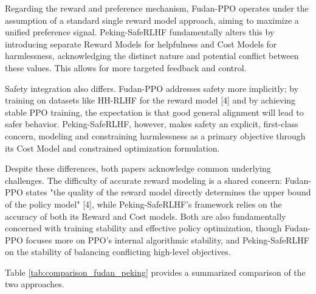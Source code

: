 \documentclass[10pt,journal,compsoc]{IEEEtran} %
\begin{document}
Regarding the reward and preference mechanism, Fudan-PPO operates under the assumption of a standard single reward model approach, aiming to maximize a unified preference signal. Peking-SafeRLHF fundamentally alters this by introducing separate Reward Models for helpfulness and Cost Models for harmlessness, acknowledging the distinct nature and potential conflict between these values. This allows for more targeted feedback and control.

Safety integration also differs. Fudan-PPO addresses safety more implicitly; by training on datasets like HH-RLHF for the reward model [4] and by achieving stable PPO training, the expectation is that good general alignment will lead to safer behavior. Peking-SafeRLHF, however, makes safety an explicit, first-class concern, modeling and constraining harmlessness as a primary objective through its Cost Model and constrained optimization formulation.

Despite these differences, both papers acknowledge common underlying challenges. The difficulty of accurate reward modeling is a shared concern: Fudan-PPO states "the quality of the reward model directly determines the upper bound of the policy model" [4], while Peking-SafeRLHF's framework relies on the accuracy of both its Reward and Cost models. Both are also fundamentally concerned with training stability and effective policy optimization, though Fudan-PPO focuses more on PPO's internal algorithmic stability, and Peking-SafeRLHF on the stability of balancing conflicting high-level objectives.

Table \ref{tab:comparison_fudan_peking} provides a summarized comparison of the two approaches.
\end{document}
